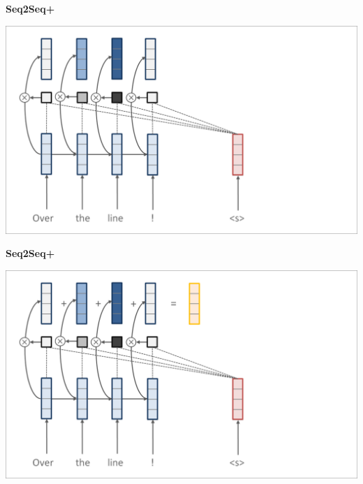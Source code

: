 \documentclass[aspectratio=169]{beamer}
\newcommand{\air}{\vspace{0.25cm}}
\begin{document}
\begin{frame}
  \begin{center}
    \textbf{Seq2Seq+} \air

  \end{center}
\center
\vspace{-5mm}
 \air
\includegraphics[scale=0.37]{nmt-attn4}
\end{frame}
\begin{frame}
  \begin{center}
    \textbf{Seq2Seq+} \air

  \end{center}
\center
\vspace{-5mm}
 \air
\includegraphics[scale=0.37]{nmt-attn5}
\end{frame}
\end{document}
